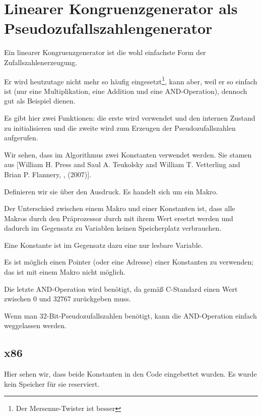 \section[Linear congruential generator]{Linearer Kongruenzgenerator als Pseudozufallszahlengenerator}
\label{LCG_simple}
Ein linearer Kongruenzgenerator ist die wohl einfachste Form der Zufallszahlenerzeugung.

Er wird heutzutage nicht mehr so häufig eingesetzt\footnote{Der Mersenne-Twister ist besser}, kann aber, weil er so
einfach ist (nur eine Multiplikation, eine Addition und eine AND-Operation), dennoch gut als Beispiel dienen.


Es gibt hier zwei Funktionen: die erste wird verwendet und den internen Zustand zu initialisieren und die zweite wird
zum Erzeugen der Pseudozufallszahlen aufgerufen.

Wir sehen, dass im Algorithmus zwei Konstanten verwendet werden.
Sie stamen aus [William H. Press and Saul A. Teukolsky and William T. Vetterling and Brian P. Flannery, , (2007)].

Definieren wir sie über den  \CCpp Ausdruck. Es handelt sich um ein Makro.

Der Unterschied zwischen einem \CCpp Makro und einer Konstanten ist, dass alle Makros durch den \CCpp Präprozessor durch
mit ihrem Wert ersetzt werden und dadurch im Gegensatz zu Variablen keinen Speicherplatz verbrauchen.

Eine Konstante ist im Gegensatz dazu eine nur lesbare Variable.

Es ist möglich einen Pointer (oder eine Adresse) einer Konstanten zu verwenden; das ist mit einem Makro nicht möglich.

Die letzte AND-Operation wird benötigt, da  gemäß C-Standard einen Wert zwischen 0 und 32767 zurückgeben
muss.

Wenn man 32-Bit-Pseudozufallszahlen benötigt, kann die AND-Operation einfach weggelassen werden.

\subsection{x86}


Hier sehen wir, dass beide Konstanten in den Code eingebettet wurden. Es wurde kein Speicher für sie reserviert.

